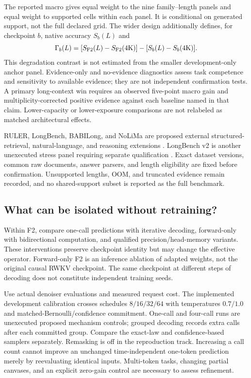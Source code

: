 The reported macro gives equal weight to the nine family--length panels and equal weight to supported cells within each panel. It is conditional on generated support, not the full declared grid. The wider design additionally defines, for checkpoint $b$, native accuracy $S_b(L)$ and
\begin{equation}
\Gamma_b(L)=[S_{\rm F2}(L)-S_{\rm F2}(4{\rm K})]-[S_b(L)-S_b(4{\rm K})].
\label{m:f2degradation}
\end{equation}
This degradation contrast is not estimated from the smaller development-only anchor panel. Evidence-only and no-evidence diagnostics assess task competence and sensitivity to available evidence; they are not independent confirmation tests. A primary long-context win requires an observed five-point macro gain and multiplicity-corrected positive evidence against each baseline named in that claim. Lower-capacity or lower-exposure comparisons are not relabeled as matched architectural effects.

RULER, LongBench, BABILong, and NoLiMa are proposed external structured-retrieval, natural-language, and reasoning extensions \citep{ruler,longbench,babilong,nolima}. LongBench v2 is another unexecuted stress panel requiring separate qualification \citep{longbench2}. Exact dataset versions, common raw documents, answer parsers, and length eligibility are fixed before confirmation. Unsupported lengths, OOM, and truncated evidence remain recorded, and no shared-support subset is reported as the full benchmark.

\subsection{What can be isolated without retraining?}
\label{m:mechanism}
Within F2, compare one-call predictions with iterative decoding, forward-only with bidirectional computation, and qualified precision/head-memory variants. These interventions preserve checkpoint identity but may change the effective operator. Forward-only F2 is an inference ablation of adapted weights, not the original causal RWKV checkpoint. The same checkpoint at different steps of decoding does not constitute independent training seeds.

Use actual denoiser evaluations and measured request cost. The implemented development calibration crosses schedules $8/16/32/64$ with temperatures $0.7/1.0$ and matched-Bernoulli/confidence commitment. One-call and four-call runs are unexecuted proposed mechanism controls; grouped decoding records extra calls after each committed group. Compare the exact-law and confidence-based samplers separately. Remasking is off in the reproduction track. Increasing a call count cannot improve an unchanged time-independent one-token prediction merely by reevaluating identical inputs. Multi-token tasks, changing partial canvases, and an explicit zero-gain control are necessary to assess refinement.

